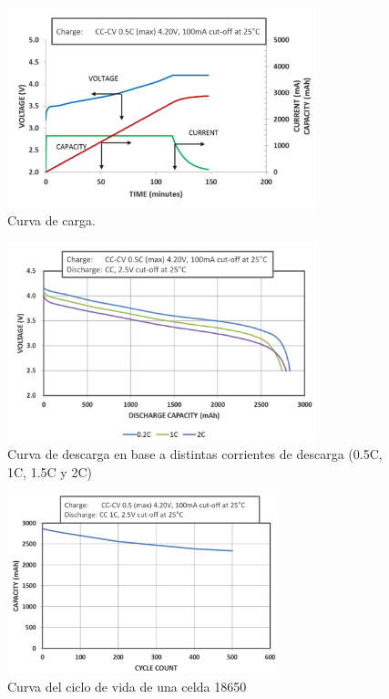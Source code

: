 \documentclass[10pt,a4paper]{article}
\begin{document}
	\begin{figure}[h!]
		\begin{center}
			\includegraphics[width=0.8\textwidth]{cc_cv_18650.png}
			\caption{Curva de carga.}
			\label{cc_cv}
		\end{center}
	\end{figure}
	
	\begin{figure}[h!]
		\begin{center}
			\includegraphics[width=0.8\textwidth]{discharge_18650.png}
			\caption{Curva de descarga en base a distintas corrientes de descarga (0.5C, 1C, 1.5C y 2C)}
			\label{descarga_18650}
		\end{center}
	\end{figure}

    \clearpage
	
	\begin{figure}[h!]
		\begin{center}
			\includegraphics[width=0.7\textwidth]{life_cycle_18650.png}
			\caption{Curva del ciclo de vida de una celda 18650}
			\label{life_cycle_18650}
		\end{center}
	\end{figure}
	
\end{document}
